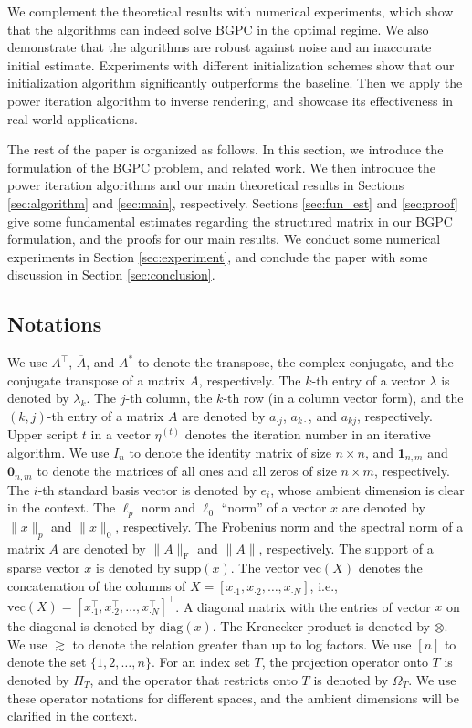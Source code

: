 \documentclass[11pt,journal]{IEEEtran}
\newcommand{\rmF}{\mathrm{F}}
\newcommand{\norm}[1]{\|{#1}\|}
\newcommand{\T}{\top}
\newcommand{\vect}{\mathrm{vec}}
\newcommand{\diag}{\mathrm{diag}}
\newcommand{\supp}{\mathrm{supp}}
\newcommand{\insrt}[1]{{\color{red}#1}}
\begin{document}
We complement the theoretical results with numerical experiments, which show that the algorithms can indeed solve BGPC in the optimal regime. We also demonstrate that the algorithms are robust against noise and an inaccurate initial estimate. Experiments with different initialization schemes show that our initialization algorithm significantly outperforms the baseline. Then we apply the power iteration algorithm to inverse rendering, and showcase its effectiveness in real-world applications.

The rest of the paper is organized as follows. In this section, we introduce the formulation of the BGPC problem, and related work. We then introduce the power iteration algorithms and our main theoretical results in Sections \ref{sec:algorithm} and \ref{sec:main}, respectively. Sections \ref{sec:fun_est} and \ref{sec:proof} give some fundamental estimates regarding the structured matrix in our BGPC formulation, and the proofs for our main results. We conduct some numerical experiments in Section \ref{sec:experiment}, and conclude the paper with some discussion in Section \ref{sec:conclusion}. 

\subsection{Notations} \label{sec:notation}

We use $A^\T$, $\overline{A}$, and $A^*$ to denote the transpose, the complex conjugate, and the conjugate transpose of a matrix $A$, respectively. The $k$-th entry of a vector $\lambda$ is denoted by $\lambda_k$. The $j$-th column, the $k$-th row (in a column vector form), and the $(k,j)$-th entry of a matrix $A$ are denoted by $a_{\cdot j}$, $a_{k \cdot}$, and $a_{k j}$, respectively. Upper script $t$ in a vector $\eta^{(t)}$ denotes the iteration number in an iterative algorithm.
We use $I_n$ to denote the identity matrix of size $n\times n$, and $\bm{1}_{n,m}$ and $\bm{0}_{n,m}$ to denote the matrices of all ones and all zeros of size $n\times m$, respectively. The $i$-th standard basis vector is denoted by $e_i$, whose ambient dimension is clear in the context.
The $\ell_p$ norm and $\ell_0$ ``norm'' of a vector $x$ are denoted by $\norm{x}_p$ and $\norm{x}_0$, respectively. The Frobenius norm and the spectral norm of a matrix $A$ are denoted by $\norm{A}_\rmF$ and $\norm{A}$, respectively. The support of a sparse vector $x$ is denoted by $\supp(x)$. The vector $\vect(X)$ denotes the concatenation of the columns of $X=[x_{\cdot 1},x_{\cdot 2},\dots, x_{\cdot N}]$, i.e., $\vect(X) = [x_{\cdot 1}^\T,x_{\cdot 2}^\T,\dots,x_{\cdot N}^\T]^\T$. A diagonal matrix with the entries of vector $x$ on the diagonal is denoted by $\diag(x)$. The Kronecker product is denoted by $\otimes$. We use $\gtrsim$ to denote the relation greater than up to log factors.
We use $[n]$ to denote the set $\{1,2,\dots,n\}$. 
For an index set $T$, the projection operator onto $T$ is denoted by $\Pi_T$, and the operator that restricts onto $T$ is denoted by $\Omega_T$. We use these operator notations for different spaces, and the ambient dimensions will be clarified in the context.
\end{document}
